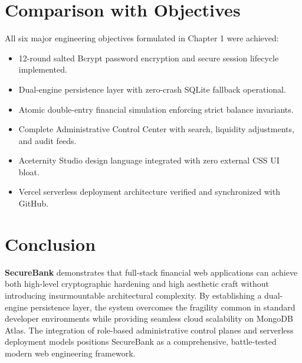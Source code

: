 \section{Comparison with Objectives}
All six major engineering objectives formulated in Chapter 1 were achieved:
\begin{itemize}
    \item[$\checkmark$] 12-round salted Bcrypt password encryption and secure session lifecycle implemented.
    \item[$\checkmark$] Dual-engine persistence layer with zero-crash SQLite fallback operational.
    \item[$\checkmark$] Atomic double-entry financial simulation enforcing strict balance invariants.
    \item[$\checkmark$] Complete Administrative Control Center with search, liquidity adjustments, and audit feeds.
    \item[$\checkmark$] Aceternity Studio design language integrated with zero external CSS UI bloat.
    \item[$\checkmark$] Vercel serverless deployment architecture verified and synchronized with GitHub.
\end{itemize}

\section{Conclusion}
\textbf{SecureBank} demonstrates that full-stack financial web applications can achieve both high-level cryptographic hardening and high aesthetic craft without introducing insurmountable architectural complexity. By establishing a dual-engine persistence layer, the system overcomes the fragility common in standard developer environments while providing seamless cloud scalability on MongoDB Atlas. The integration of role-based administrative control planes and serverless deployment models positions SecureBank as a comprehensive, battle-tested modern web engineering framework.

